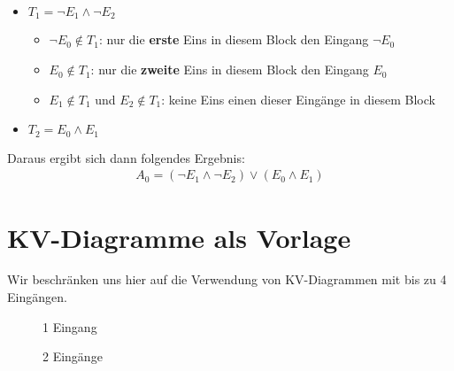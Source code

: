 \begin{example}
\begin{itemize}
\item $T_1 = \neg E_1 \wedge \neg E_2$
\begin{itemize}
\item $\neg E_0 \notin T_1$: nur die \textbf{erste} Eins in diesem Block  den Eingang $\neg E_0$
\item $E_0 \notin T_1$: nur die \textbf{zweite} Eins in diesem Block  den Eingang $E_0$
\item $E_1 \notin T_1$ und $E_2 \notin T_1$: keine Eins  einen dieser Eingänge in diesem Block 
\end{itemize}
\item $T_2 = E_0 \wedge E_1$
\end{itemize}

Daraus ergibt sich dann folgendes Ergebnis:
\begin{align*}
A_0 = (\neg E_1 \wedge \neg E_2) \vee (E_0 \wedge E_1)
\end{align*}

\end{example}

\section{\acs{KV}-Diagramme als Vorlage}

Wir beschränken uns hier auf die Verwendung von \ac{KV}-Diagrammen mit bis zu \num{4} Eingängen.

\begin{figure}[htb]
\centering
\begin{minipage}{0.45\textwidth}
\centering
{}
\caption{\num{1} Eingang}
\label{figure-kv-diagramm-e-1}
\end{minipage}
\hfill
\begin{minipage}{0.45\textwidth}
\centering
{}
\caption{\num{2} Eingänge}
\label{figure-kv-diagramm-e-2}
\end{minipage}
\end{figure}

